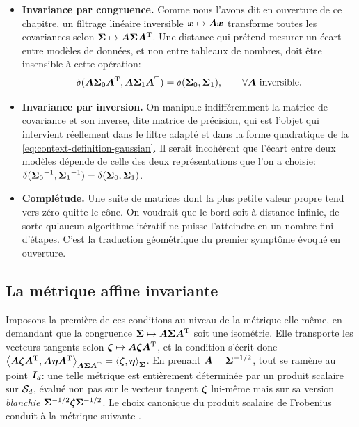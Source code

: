 \begin{itemize}
  \item \textbf{Invariance par congruence.} Comme nous l'avons dit en ouverture de ce chapitre, un filtrage linéaire inversible $\boldsymbol{x}\mapsto\boldsymbol{A}\boldsymbol{x}$ transforme toutes les covariances selon $\boldsymbol{\Sigma}\mapsto\boldsymbol{A}\boldsymbol{\Sigma}\boldsymbol{A}^{\mathrm{T}}$. Une distance qui prétend mesurer un écart entre modèles de données, et non entre tableaux de nombres, doit être insensible à cette opération:
  \begin{equation}
    \delta(\boldsymbol{A}\boldsymbol{\Sigma}_0\boldsymbol{A}^{\mathrm{T}}, \boldsymbol{A}\boldsymbol{\Sigma}_1\boldsymbol{A}^{\mathrm{T}})
    =
    \delta(\boldsymbol{\Sigma}_0,\boldsymbol{\Sigma}_1),
    \qquad
    \forall \boldsymbol{A} \text{ inversible.}
    \label{eq:context-riemann-invcongruence}
  \end{equation}
  \item \textbf{Invariance par inversion.} On manipule indifféremment la matrice de covariance et son inverse, dite matrice de précision, qui est l'objet qui intervient réellement dans le filtre adapté et dans la forme quadratique de la \cref{eq:context-definition-gaussian}. Il serait incohérent que l'écart entre deux modèles dépende de celle des deux représentations que l'on a choisie: $\delta({\boldsymbol{\Sigma}_0}^{-1},{\boldsymbol{\Sigma}_1}^{-1})=\delta(\boldsymbol{\Sigma}_0,\boldsymbol{\Sigma}_1)$.
  \item \textbf{Complétude.} Une suite de matrices dont la plus petite valeur propre tend vers zéro quitte le cône. On voudrait que le bord soit à distance infinie, de sorte qu'aucun algorithme itératif ne puisse l'atteindre en un nombre fini d'étapes. C'est la traduction géométrique du premier symptôme évoqué en ouverture.
\end{itemize}

\subsection{La métrique affine invariante}

Imposons la première de ces conditions au niveau de la métrique elle-même, en demandant que la congruence $\boldsymbol{\Sigma}\mapsto\boldsymbol{A}\boldsymbol{\Sigma}\boldsymbol{A}^{\mathrm{T}}$ soit une isométrie. Elle transporte les vecteurs tangents selon $\boldsymbol{\zeta}\mapsto\boldsymbol{A}\boldsymbol{\zeta}\boldsymbol{A}^{\mathrm{T}}$, et la condition s'écrit donc
$\left\langle \boldsymbol{A}\boldsymbol{\zeta}\boldsymbol{A}^{\mathrm{T}}, \boldsymbol{A}\boldsymbol{\eta}\boldsymbol{A}^{\mathrm{T}} \right\rangle_{\boldsymbol{A}\boldsymbol{\Sigma}\boldsymbol{A}^{\mathrm{T}}}=\left\langle \boldsymbol{\zeta}, \boldsymbol{\eta} \right\rangle_{\boldsymbol{\Sigma}}$. En prenant $\boldsymbol{A}=\boldsymbol{\Sigma}^{-1/2}$, tout se ramène au point $\boldsymbol{I}_{d}$: une telle métrique est entièrement déterminée par un produit scalaire sur $\mathcal{S}_{d}$, évalué non pas sur le vecteur tangent $\boldsymbol{\zeta}$ lui-même mais sur sa version \emph{blanchie} $\boldsymbol{\Sigma}^{-1/2}\boldsymbol{\zeta}\boldsymbol{\Sigma}^{-1/2}$. Le choix canonique du produit scalaire de Frobenius conduit à la métrique suivante .

